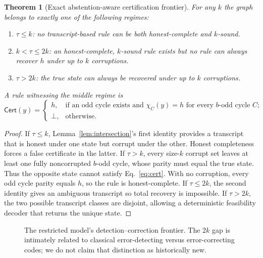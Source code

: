 \documentclass[10pt,a4paper]{article}
\newtheorem{theorem}{Theorem}
\newcommand{\Cert}{\mathsf{Cert}}
\begin{document}
\begin{theorem}[Exact abstention-aware certification frontier]\label{thm:trichotomy}
For any $k$ the graph belongs to exactly one of the following regimes:
\begin{enumerate}
\item $\tau\le k$: \emph{no transcript-based rule} can be both honest-complete and $k$-sound.
\item $k<\tau\le2k$: an honest-complete, $k$-sound rule exists but \emph{no rule} can always recover $h$ under up to $k$ corruptions.
\item $\tau>2k$: the true state can always be recovered under up to $k$ corruptions.
\end{enumerate}
A rule witnessing the middle regime is
\begin{equation}\label{eq:cert}
 \Cert(y)=\begin{cases}
 h,&\text{if an odd cycle exists and $\chi_C(y)=h$ for every $b$-odd cycle $C$};\\
 \bot,&\text{otherwise.}
 \end{cases}
\end{equation}
\end{theorem}
\begin{proof}
If $\tau\le k$, Lemma~\ref{lem:intersection}'s first identity provides a transcript that is honest under one state but corrupt under the other. Honest completeness forces a false certificate in the latter. If $\tau>k$, every size-$k$ corrupt set leaves at least one fully noncorrupted $b$-odd cycle, whose parity must equal the true state. Thus the opposite state cannot satisfy Eq.~\eqref{eq:cert}. With no corruption, every odd cycle parity equals $h$, so the rule is honest-complete. If $\tau\le2k$, the second identity gives an ambiguous transcript so total recovery is impossible. If $\tau>2k$, the two possible transcript classes are disjoint, allowing a deterministic feasibility decoder that returns the unique state.\end{proof}

\begin{figure}[t]
\centering
{}
\caption{The restricted model's detection--correction frontier. The $2k$ gap is intimately related to classical error-detecting versus error-correcting codes; we do not claim that distinction as historically new.}
\end{figure}
\end{document}
